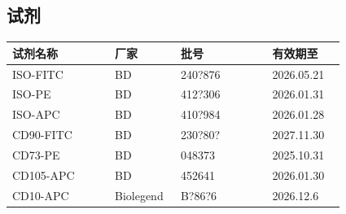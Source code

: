 \documentclass[UTF8,10pt,a4paper,fontset=fandol]{ctexart}
\newcommand{\fieldvalue}[1]{#1}
\newcommand{\handwritten}[1]{#1}
\begin{document}
\subsection{试剂}

\begin{tabular}{|p{0.28\linewidth}|p{0.18\linewidth}|p{0.25\linewidth}|p{0.20\linewidth}|}
\hline
试剂名称 & 厂家 & 批号 & 有效期至\\
\hline
ISO-FITC & BD &
\fieldvalue{\handwritten{240?876}} &
\fieldvalue{\handwritten{2026.05.21}}\\
\hline
ISO-PE & BD &
\fieldvalue{\handwritten{412?306}} &
\fieldvalue{\handwritten{2026.01.31}}\\
\hline
ISO-APC & BD &
\fieldvalue{\handwritten{410?984}} &
\fieldvalue{\handwritten{2026.01.28}}\\
\hline
CD90-FITC & BD &
\fieldvalue{\handwritten{230?80?}} &
\fieldvalue{\handwritten{2027.11.30}}\\
\hline
CD73-PE & BD &
\fieldvalue{\handwritten{048373}} &
\fieldvalue{\handwritten{2025.10.31}}\\
\hline
CD105-APC & BD &
\fieldvalue{\handwritten{452641}} &
\fieldvalue{\handwritten{2026.01.30}}\\
\hline
CD10-APC & Biolegend &
\fieldvalue{\handwritten{B?86?6}} &
\fieldvalue{\handwritten{2026.12.6}}\\

\end{tabular}
\end{document}
